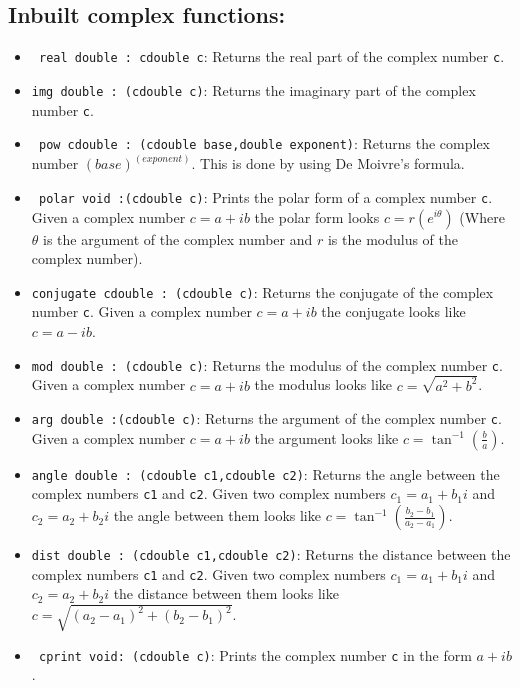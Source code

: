\documentclass[12pt]{article}
\begin{document}
\subsection{Inbuilt complex functions:}
\begin{itemize}
    \item \texttt{ real double : cdouble c}: Returns the real part of the complex number \texttt{c}.
    \item \texttt{img double : (cdouble c)}: Returns the imaginary part of the complex number \texttt{c}.
    \item \texttt{ pow cdouble : (cdouble base,double exponent)}: Returns the complex number ${(base)}^{(exponent)}$. This is done by using De Moivre's formula.
    \item \texttt{ polar void :(cdouble c)}: Prints the polar form of a complex number \texttt{c}. Given a complex number $c=a+ib$ the polar form looks $c=r(e^{i \theta })$ (Where $\theta$ is the argument of the complex number and $r$ is the modulus of the complex number).
    \item \texttt{conjugate cdouble : (cdouble c)}: Returns the conjugate of the complex number \texttt{c}. Given a complex number $c=a+ib$ the conjugate looks like $c=a-ib$.
    \item  \texttt{mod double : (cdouble c)}: Returns the modulus of the complex number \texttt{c}. Given a complex number $c=a+ib$ the modulus looks like $c=\sqrt{a^2+b^2}$.
    \item \texttt{arg double :(cdouble c)}: Returns the argument of the complex number \texttt{c}. Given a complex number $c=a+ib$ the argument looks like $c=\tan^{-1}(\frac{b}{a})$.
    \item  \texttt{angle double : (cdouble c1,cdouble c2)}: Returns the angle between the complex numbers \texttt{c1} and \texttt{c2}. Given two complex numbers $c_1=a_1+b_1i$ and $c_2=a_2+b_2i$ the angle between them looks like $c=\tan^{-1}(\frac{b_2-b_1}{a_2-a_1})$.
    \item \texttt{dist double : (cdouble c1,cdouble c2)}: Returns the distance between the complex numbers \texttt{c1} and \texttt{c2}. Given two complex numbers $c_1=a_1+b_1i$ and $c_2=a_2+b_2i$ the distance between them looks like $c=\sqrt{(a_2-a_1)^2+(b_2-b_1)^2}$.
    \item \texttt{ cprint void: (cdouble c)}: Prints the complex number \texttt{c} in the form $a+ib$.
\end{itemize}
\end{document}
